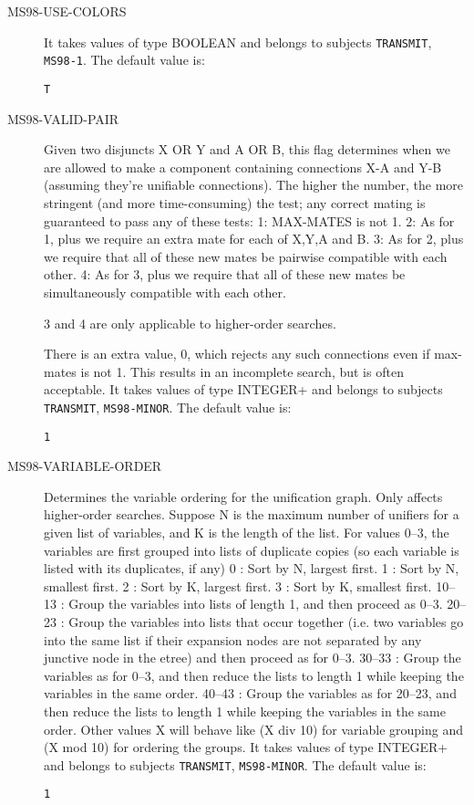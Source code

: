 \begin{description}
\item[MS98-USE-COLORS]  
It takes values of type BOOLEAN and belongs to subjects \texttt{TRANSMIT}, \texttt{MS98-1}.  The default value is: \begin{lstlisting}
T
\end{lstlisting}

\item[MS98-VALID-PAIR]  
Given two disjuncts X OR Y and A OR B, this flag 
determines when we are allowed to make a component containing 
connections X-A and Y-B (assuming they're unifiable connections).
The higher the number, the more stringent (and more time-consuming)
the test; any correct mating is guaranteed to pass any of these tests:
1: MAX-MATES is not 1.
2: As for 1, plus we require an extra mate for each of X,Y,A and B.
3: As for 2, plus we require that all of these new mates be 
   pairwise compatible with each other.
4: As for 3, plus we require that all of these new mates be 
   simultaneously compatible with each other.

3 and 4 are only applicable to higher-order searches.

There is an extra value, 0, which rejects any such connections
even if max-mates is not 1. This results in an incomplete search,
but is often acceptable.
It takes values of type INTEGER+ and belongs to subjects \texttt{TRANSMIT}, \texttt{MS98-MINOR}.  The default value is: \begin{lstlisting}
1
\end{lstlisting}

\item[MS98-VARIABLE-ORDER]  
Determines the variable ordering for the unification
graph. Only affects higher-order searches.
Suppose N is the maximum number of unifiers for a 
given list of variables, and K is the length of the list.
For values 0--3, the variables are first grouped into lists of duplicate
copies (so each variable is listed with its duplicates, if any)
0 : Sort by N, largest first.
1 : Sort by N, smallest first.
2 : Sort by K, largest first.
3 : Sort by K, smallest first.
10--13 : Group the variables into lists of length 1, and then proceed
as 0--3.
20--23 : Group the variables into lists that occur together (i.e. two
variables go into the same list if their expansion nodes are not separated 
by any junctive node in the etree) and then proceed as for 0--3.
30--33 : Group the variables as for 0--3, and then reduce the lists 
to length 1 while keeping the variables in the same order.
40--43 : Group the variables as for 20--23, and then reduce the lists 
to length 1 while keeping the variables in the same order.
Other values X will behave like (X div 10) for variable grouping and
(X mod 10) for ordering the groups.
It takes values of type INTEGER+ and belongs to subjects \texttt{TRANSMIT}, \texttt{MS98-MINOR}.  The default value is: \begin{lstlisting}
1
\end{lstlisting}


\end{description}
